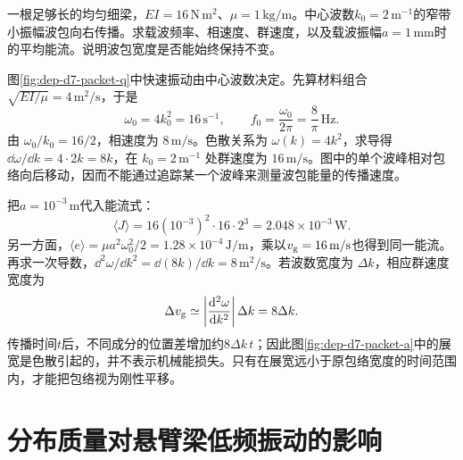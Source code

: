 \begin{example}[弯曲波包的传播]
一根足够长的均匀细梁，$EI=16\,\mathrm{N\,m^2}$、$\mu=1\,\mathrm{kg/m}$。中心波数$k_0=2\,\mathrm{m^{-1}}$的窄带小振幅波包向右传播。求载波频率、相速度、群速度，以及载波振幅$a=1\,\mathrm{mm}$时的平均能流。说明波包宽度是否能始终保持不变。
\end{example}
\begin{solution}
图\ref{fig:dep-d7-packet-q}中快速振动由中心波数决定。先算材料组合$\sqrt{EI/\mu}=4\,\mathrm{m^2/s}$，于是
\[
 \omega_0=4k_0^2=16\,\mathrm{s^{-1}},\qquad
 f_0=\frac{\omega_0}{2\pi}=\frac8\pi\,\mathrm{Hz}.
\]
由 $\omega_0/k_0=16/2$，相速度为 $8\,\mathrm{m/s}$。色散关系为 $\omega(k)=4k^2$，求导得 $\dd\omega/\dd k=4\cdot2k=8k$，在 $k_0=2\,\mathrm{m^{-1}}$ 处群速度为 $16\,\mathrm{m/s}$。图中的单个波峰相对包络向后移动，因而不能通过追踪某一个波峰来测量波包能量的传播速度。

把$a=10^{-3}\,\mathrm m$代入能流式：
\[
 \langle J\rangle
 =16(10^{-3})^2\cdot16\cdot2^3
 =2.048\times10^{-3}\,\mathrm W.
\]
另一方面，$\langle e\rangle=\mu a^2\omega_0^2/2
=1.28\times10^{-4}\,\mathrm{J/m}$，乘以$v_{\rm g}=16\,\mathrm{m/s}$也得到同一能流。
再求一次导数，$\dd^2\omega/\dd k^2=\dd(8k)/\dd k=8\,\mathrm{m^2/s}$。若波数宽度为 $\Delta k$，相应群速度宽度为
\[
 \Delta v_{\rm g}\simeq
 \left|\frac{\mathop{}\!\mathrm d^2\omega}{\mathop{}\!\mathrm d k^2}\right|\Delta k
 =8\Delta k.
\]
传播时间$t$后，不同成分的位置差增加约$8\Delta k\,t$；因此图\ref{fig:dep-d7-packet-a}中的展宽是色散引起的，并不表示机械能损失。只有在展宽远小于原包络宽度的时间范围内，才能把包络视为刚性平移。
\end{solution}

\section{分布质量对悬臂梁低频振动的影响}
